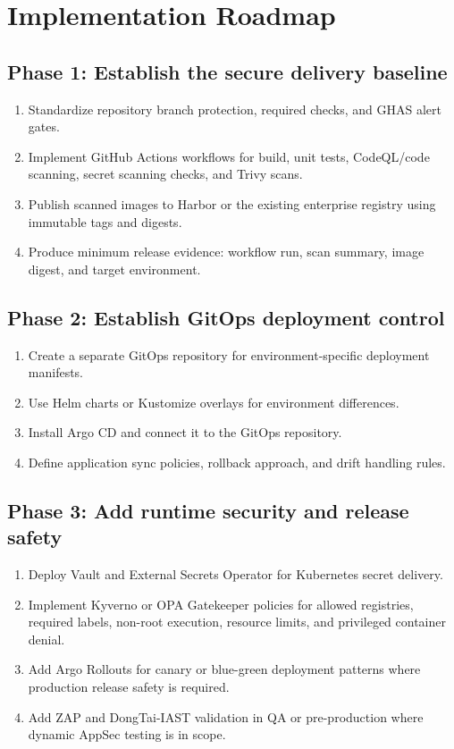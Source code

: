 \documentclass[10pt,letterpaper]{article}
\begin{document}
\section{Implementation Roadmap}

\subsection{Phase 1: Establish the secure delivery baseline}
\begin{enumerate}
  \item Standardize repository branch protection, required checks, and GHAS alert gates.
  \item Implement GitHub Actions workflows for build, unit tests, CodeQL/code scanning, secret scanning checks, and Trivy scans.
  \item Publish scanned images to Harbor or the existing enterprise registry using immutable tags and digests.
  \item Produce minimum release evidence: workflow run, scan summary, image digest, and target environment.
\end{enumerate}

\subsection{Phase 2: Establish GitOps deployment control}
\begin{enumerate}
  \item Create a separate GitOps repository for environment-specific deployment manifests.
  \item Use Helm charts or Kustomize overlays for environment differences.
  \item Install Argo CD and connect it to the GitOps repository.
  \item Define application sync policies, rollback approach, and drift handling rules.
\end{enumerate}

\subsection{Phase 3: Add runtime security and release safety}
\begin{enumerate}
  \item Deploy Vault and External Secrets Operator for Kubernetes secret delivery.
  \item Implement Kyverno or OPA Gatekeeper policies for allowed registries, required labels, non-root execution, resource limits, and privileged container denial.
  \item Add Argo Rollouts for canary or blue-green deployment patterns where production release safety is required.
  \item Add ZAP and DongTai-IAST validation in QA or pre-production where dynamic AppSec testing is in scope.
\end{enumerate}
\end{document}
